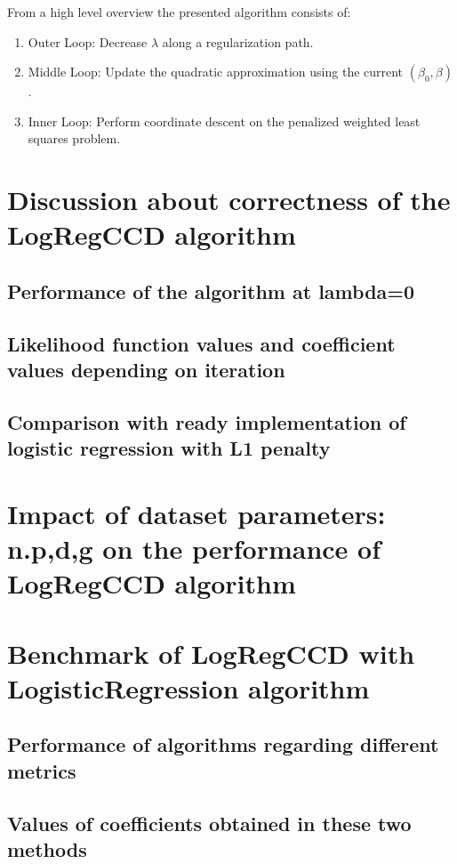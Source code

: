 \documentclass[12pt]{article}
\begin{document}
From a high level overview the presented algorithm consists of:

\begin{enumerate}
    \item Outer Loop: Decrease $\lambda$ along a regularization path.
    \item Middle Loop: Update the quadratic approximation using the current $(\beta_0, \beta)$.
    \item Inner Loop: Perform coordinate descent on the penalized weighted least squares problem.
\end{enumerate}



\section{Discussion about correctness of the LogRegCCD algorithm}

\subsection{Performance of the algorithm at lambda=0}

\subsection{Likelihood function values and coefficient values depending on iteration}

\subsection{Comparison with ready implementation of logistic regression with L1 penalty}

\section{Impact of dataset parameters: n.p,d,g on the performance of LogRegCCD algorithm}

\section{Benchmark of LogRegCCD with LogisticRegression algorithm}

\subsection{Performance of algorithms regarding different metrics}

\subsection{Values of coefficients obtained in these two methods}



\clearpage 
\listoffigures
\listoftables
\printbibliography
\end{document}
